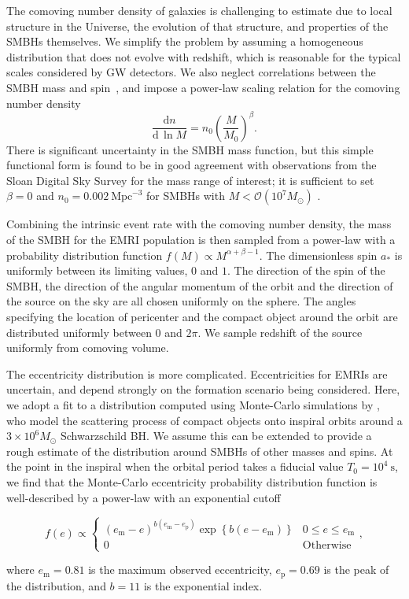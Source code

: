 \documentclass[aps,prd,amsfonts,amssymb,amsmath,nofootinbib,showpacs,superscriptaddress,twocolumn]{revtex4}
\newcommand{\sub}[1]{\ensuremath{_\mathrm{#1}}}
\newcommand{\dd}{\ensuremath{\mathrm{d}}}
\newcommand{\diff}[2]{\ensuremath{\dfrac{\dd {#1}}{\dd {#2}}}}
\newcommand{\order}[1]{\ensuremath{\mathcal{O}({#1})}}
\begin{document}
The comoving number density of galaxies is challenging to estimate due to local structure in the Universe, the evolution of that structure, and properties of the SMBHs themselves. We simplify the problem by assuming a homogeneous distribution that does not evolve with redshift, which is reasonable for the typical scales considered by GW detectors. We also neglect correlations between the SMBH mass and spin~\cite{Volonteri2010}, and impose a power-law scaling relation for the comoving number density
\begin{equation}
\diff{n}{\,\ln M} = n_0 \left(\frac{M}{M_0}\right)^\beta.
\end{equation}
There is significant uncertainty in the SMBH mass function, but this simple functional form is found to be in good agreement with observations from the Sloan Digital Sky Survey for the mass range of interest; it is sufficient to set $\beta = 0$ and $n_0 = 0.002~\mathrm{Mpc}^{-3}$ for SMBHs with $M < \order{10^7 M_\odot}$ \citep{Greene2007, Gair2010b}.

Combining the intrinsic event rate with the comoving number density, the mass of the SMBH for the EMRI population is then sampled from a power-law with a probability distribution function $f(M) \propto M^{\alpha+\beta-1}$. The dimensionless spin $a_\ast$ is uniformly between its limiting values, $0$ and $1$. The direction of the spin of the SMBH, the direction of the angular momentum of the orbit and the direction of the source on the sky are all chosen uniformly on the sphere. The angles specifying the location of pericenter and the compact object around the orbit are distributed uniformly between $0$ and $2\pi$. We sample redshift of the source uniformly from comoving volume.

The eccentricity distribution is more complicated. Eccentricities for EMRIs are uncertain, and depend strongly on the formation scenario being considered. Here, we adopt a fit to a distribution computed using Monte-Carlo simulations by \citet{Hopman2005}, who model the scattering process of compact objects onto inspiral orbits around a $3 \times 10^6 M_\odot$ Schwarzschild BH. We assume this can be extended to provide a rough estimate of the distribution around SMBHs of other masses and spins. At the point in the inspiral when the orbital period takes a fiducial value $T_0 = 10^4~\mathrm{s}$, we find that the Monte-Carlo eccentricity probability distribution function is well-described by a power-law with an exponential cutoff
\begin{widetext}\begin{equation}
\label{eq:EMRI-e-distribution}
f(e) \propto 
	\begin{cases}
		\left(e\sub{m}-e\right)^{b(e\sub{m}-e\sub{p})} \exp\left\{b(e-e\sub{m})\right\} & 0 \leq e \leq e\sub{m}\\
		0 &\mathrm{Otherwise}
	\end{cases},
\end{equation}\end{widetext}
where $e\sub{m} = 0.81$ is the maximum observed eccentricity, $e\sub{p} = 0.69$ is the peak of the distribution, and $b=11$ is the exponential index. 
\end{document}
